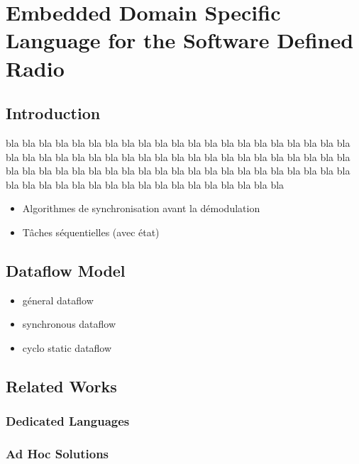 \graphicspath{{main/chapter6/fig/}}

\chapter{Embedded Domain Specific Language for the Software Defined Radio}

\minitoccustom

\section{Introduction}

bla bla bla bla bla bla bla bla bla bla bla bla bla bla bla bla bla bla bla bla
bla bla bla bla bla bla bla bla bla bla bla bla bla bla bla bla bla bla bla bla
bla bla bla bla bla bla bla bla bla bla bla bla bla bla bla bla bla bla bla bla
bla bla bla bla bla bla bla bla bla bla bla bla bla bla bla bla bla bla bla bla

\begin{itemize}
  \item Algorithmes de synchronisation avant la démodulation
  \item Tâches séquentielles (avec état)
\end{itemize}

\section{Dataflow Model}

\begin{itemize}
  \item géneral dataflow
  \item synchronous dataflow
  \item cyclo static dataflow
\end{itemize}

\section{Related Works}

\subsection{Dedicated Languages}

\subsection{Ad Hoc Solutions}

